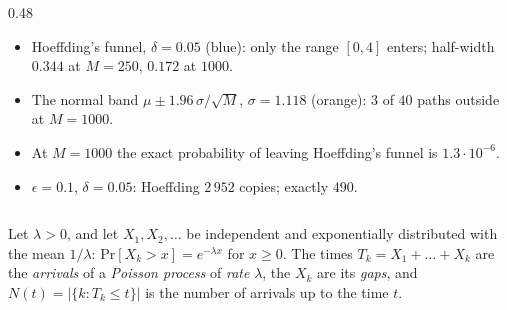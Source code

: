 \documentclass[handoutsbeamer.tex]{subfiles}
\begin{document}
\begin{frame}
{\begin{columns}[c]
\begin{column}{0.48\textwidth}
\begin{itemize}
    \item Hoeffding's funnel, $\delta = 0.05$ (blue): only the range $[0,4]$ enters; half-width $0.344$ at $M = 250$, $0.172$ at $1000$.
    \item The normal band $\mu\pm1.96\,\sigma/\sqrt M$, $\sigma = 1.118$ (orange): $3$ of $40$ paths outside at $M = 1000$.
    \item At $M = 1000$ the exact probability of leaving Hoeffding's funnel is $1.3\cdot10^{-6}$.
    \item $\epsilon = 0.1$, $\delta = 0.05$: Hoeffding $2\,952$ copies; exactly $490$.
\end{itemize}\end{column}\end{columns}}
\end{frame}

\begin{frame}
\onp{\footnotesize}
\begin{defn}\label{defn:ch09:poisson}
Let $\lambda>0$, and let $X_1,X_2,\dots$ be independent and exponentially distributed with the mean $1/\lambda$: $\mathrm{Pr}[X_k>x] = e^{-\lambda x}$ for $x\ge0$. The times $T_k = X_1+\dots+X_k$ are the \emph{arrivals} of a \emph{Poisson process} of \emph{rate} $\lambda$, the $X_k$ are its \emph{gaps}, and $N(t) = |\{k : T_k\le t\}|$ is the number of arrivals up to the time $t$.
\end{defn}
\end{frame}
\end{document}
